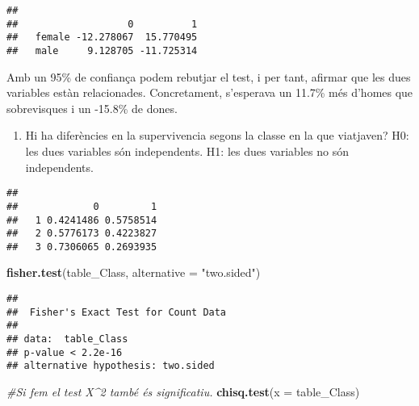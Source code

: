\documentclass[]{article}
\newenvironment{Shaded}{\begin{snugshade}}{\end{snugshade}}
\newcommand{\CommentTok}[1]{\textcolor[rgb]{0.56,0.35,0.01}{\textit{#1}}}
\newcommand{\DataTypeTok}[1]{\textcolor[rgb]{0.13,0.29,0.53}{#1}}
\newcommand{\DecValTok}[1]{\textcolor[rgb]{0.00,0.00,0.81}{#1}}
\newcommand{\KeywordTok}[1]{\textcolor[rgb]{0.13,0.29,0.53}{\textbf{#1}}}
\newcommand{\NormalTok}[1]{#1}
\newcommand{\OperatorTok}[1]{\textcolor[rgb]{0.81,0.36,0.00}{\textbf{#1}}}
\newcommand{\StringTok}[1]{\textcolor[rgb]{0.31,0.60,0.02}{#1}}
\providecommand{\tightlist}{%
  \setlength{\itemsep}{0pt}\setlength{\parskip}{0pt}}
\begin{document}
\begin{verbatim}
##         
##                   0          1
##   female -12.278067  15.770495
##   male     9.128705 -11.725314
\end{verbatim}

Amb un 95\% de confiança podem rebutjar el test, i per tant, afirmar que
les dues variables estàn relacionades. Concretament, s'esperava un
11.7\% més d'homes que sobrevisques i un -15.8\% de dones.

\begin{enumerate}
\def\labelenumi{\arabic{enumi}.}
\setcounter{enumi}{2}
\tightlist
\item
  Hi ha diferències en la supervivencia segons la classe en la que
  viatjaven? H0: les dues variables són independents. H1: les dues
  variables no són independents.
\end{enumerate}

\begin{Shaded}
\end{Shaded}

\begin{verbatim}
##    
##             0         1
##   1 0.4241486 0.5758514
##   2 0.5776173 0.4223827
##   3 0.7306065 0.2693935
\end{verbatim}

\begin{Shaded}
\begin{Highlighting}[]
\KeywordTok{fisher.test}\NormalTok{(table_Class, }\DataTypeTok{alternative =} \StringTok{"two.sided"}\NormalTok{)}
\end{Highlighting}
\end{Shaded}

\begin{verbatim}
## 
##  Fisher's Exact Test for Count Data
## 
## data:  table_Class
## p-value < 2.2e-16
## alternative hypothesis: two.sided
\end{verbatim}

\begin{Shaded}
\begin{Highlighting}[]
\CommentTok{#Si fem el test X^2 també és significatiu.}
\KeywordTok{chisq.test}\NormalTok{(}\DataTypeTok{x =}\NormalTok{ table_Class)}
\end{Highlighting}
\end{Shaded}
\end{document}
